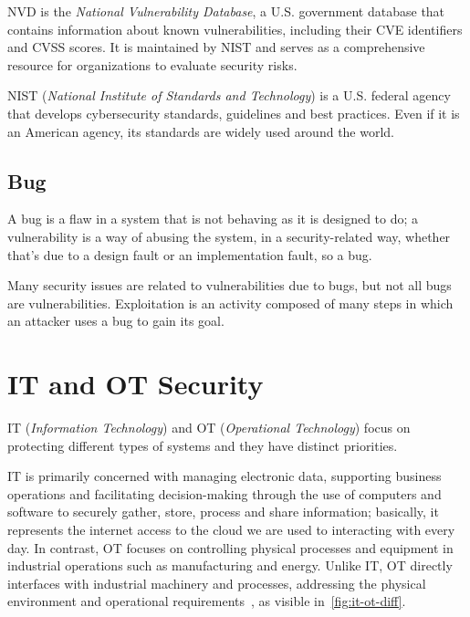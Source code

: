 
NVD is the \textit{National Vulnerability Database}, a U.S. government database that contains information about known vulnerabilities, including their CVE identifiers and CVSS scores. It is maintained by NIST and serves as a comprehensive resource for organizations to evaluate security risks.

NIST (\textit{National Institute of Standards and Technology}) is a U.S. federal agency that develops cybersecurity standards, guidelines and best practices. Even if it is an American agency, its standards are widely used around the world.

\subsection{Bug}

A bug is a flaw in a system that is not behaving as it is designed to do; a vulnerability is a way of abusing the system, in a security-related way, whether that's due to a design fault or an implementation fault, so a bug.

Many security issues are related to vulnerabilities due to bugs, but not all bugs are vulnerabilities. Exploitation is an activity composed of many steps in which an attacker uses a bug to gain its goal.

\section{IT and OT Security}

IT (\textit{Information Technology}) and OT (\textit{Operational Technology}) focus on protecting different types of systems and they have distinct priorities.

IT is primarily concerned with managing electronic data, supporting business operations and facilitating decision-making through the use of computers and software to securely gather, store, process and share information; basically, it represents the internet access to the cloud we are used to interacting with every day. In contrast, OT focuses on controlling physical processes and equipment in industrial operations such as manufacturing and energy. Unlike IT, OT directly interfaces with industrial machinery and processes, addressing the physical environment and operational requirements~\cite{paloalto-it-ot-diff}, as visible in~\cref{fig:it-ot-diff}.

